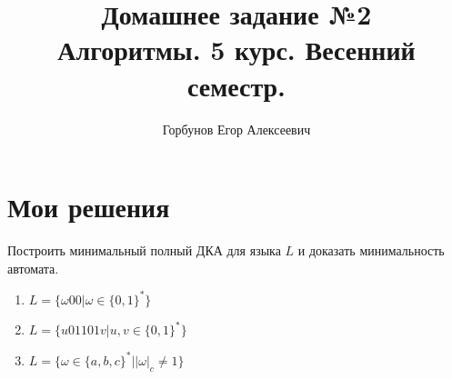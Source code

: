 
\title{Домашнее задание №2 \\ Алгоритмы. 5 курс. Весенний семестр.}
\author{Горбунов Егор Алексеевич}


\maketitle

\section{Мои решения}
\begin{task}[1]
	Построить минимальный полный ДКА для языка $L$ и доказать минимальность автомата.
	\begin{enumerate}[label = (\alph*)]
		\item $L = \lbrace \omega 0 0 | \omega \in \lbrace 0, 1 \rbrace^* \rbrace$
		\item $L = \lbrace u01101v | u,v \in \lbrace 0, 1 \rbrace^* \rbrace$
		\item $L = \lbrace \omega \in \lbrace a,b,c \rbrace^* | |\omega|_c \neq 1 \rbrace$
	\end{enumerate}
\end{task}
